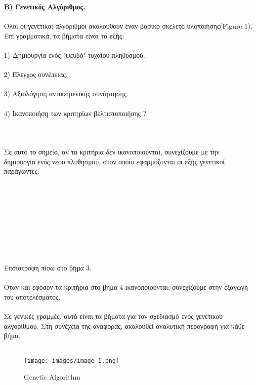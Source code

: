 \documentclass[12pt]{article}
\begin{document}
{\bfseries Β) Γενετικός Αλγόριθμος.}
\\\\Όλοι οι γενετικοί αλγόριθμοι ακολουθούν έναν βασικό σκελετό υλοποιήσης(Figure 1). Επί γραμματικά, τα βήματα είναι τα εξής:\\\\
1) Δημιουργία ενός "ψευδό"-τυχαίου πληθυσμού.\\\\
2) Έλεγχος συνέπειας.\\\\
3) Αξιολόγηση αντικειμενικής συνάρτησης.\\\\
4) Ικανοποιήση των κριτηρίων βελτιστοποιήσης ?\\\\\\\\
Σε αυτό το σημείο, αν τα κριτήρια δεν ικανοποιούνται, συνεχίζουμε με την δημιουργία ενός νέου πλυθησμού, στον οποίο εφαρμόζονται οι εξής γενετικοί παράγωντες:\\\\
 \\\\
\\\\
\\\\
\\\\
Επσιστροφή πίσω στο βήμα 3.\\\\
Όταν και εφόσον τα κριτήρια στο βήμα 4 ικανοποιούνται, συνεχίζουμε στην εξαγωγή του αποτελέσματος.\\\\
Σε γενικές γραμμές, αυτά είναι τα βήματα για τον σχεδιασμό ενός γενετικού αλγορίθμου. Στη συνέχεια της αναφοράς, ακολουθεί αναλυτική περογραφή για κάθε βήμα.\\\\

\begin{figure}[!h]
    \centering
    \texttt{[image: images/image\_1.png]}
    \caption{Genetic Algorithm}
    \label{fig:my_label}
\end{figure}
\end{document}
